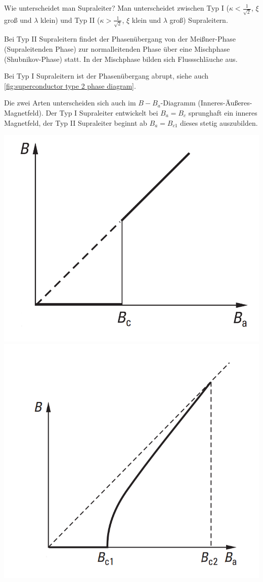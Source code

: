 \begin{fquestion}{Wie unterscheidet man Supraleiter?}
    Man unterscheidet zwischen Typ I ($\kappa < \frac{1}{\sqrt{2}}$, $\xi$ groß und $\lambda$ klein) und Typ II ($\kappa > \frac{1}{\sqrt{2}}$, $\xi$ klein und $\lambda$ groß) Supraleitern.
    
    Bei Typ II Supraleitern findet der Phasenübergang von der Meißner-Phase (Supraleitenden Phase) zur normalleitenden Phase über eine Mischphase (Shubnikov-Phase) statt. 
    In der Mischphase bilden sich Flussschläuche aus.
    
    Bei Typ I Supraleitern ist der Phasenübergang abrupt, siehe auch \autoref{fig:superconductor type 2 phase diagram}.
    
    Die zwei Arten unterscheiden sich auch im $B-B_a$-Diagramm (Inneres-Äußeres-Magnetfeld).
    Der Typ I Supraleiter entwickelt bei $B_a = B_c$ sprunghaft ein inneres Magnetfeld, der Typ II Supraleiter beginnt ab $B_a = B_{c1}$ dieses stetig auszubilden.
    
    \begin{center}
        \includegraphics[width=0.4\linewidth]{img/Supraleiter_typ1.png}
        \includegraphics[width=0.4\linewidth]{img/Supraleiter_typ2.png}
    \end{center}
\end{fquestion}

